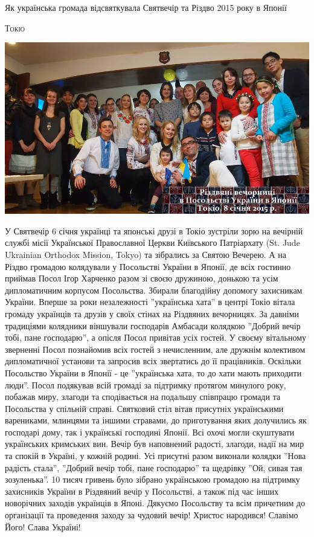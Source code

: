 \documentclass[10pt,a4paper]{article}
\newcommand{\NewsItem}[1]{%
		\usefont{T2A}{iwona}{m}{n} 
		\large #1 \vspace{4pt}
		\par \normalsize \normalfont}
\newcommand{\NewsAuthor}[1]{%
			\hfill \textsc{#1} \vspace{4pt}
			\par \normalfont}
\begin{document}
\newpage

\begin{multicols}{3}
\vspace{1cm}
\NewsItem{Як українська громада відсвяткувала Святвечір та Різдво 2015 року в Японії}
\NewsAuthor{Токіо}
		\begin{center}
			\includegraphics[width=0.8\linewidth]{images/rizdvo}
		\end{center}
У Святвечір 6 січня українці та японські друзі в Токіо зустріли зорю на вечірній службі місії Української Православної Церкви Київського Патріархату (St. Jude Ukrainian Orthodox Mission, Tokyo) та зібрались за Святою Вечерею.
А на Різдво громадою колядували у Посольствi України в Японії, де всіх гостинно приймав Посол Ігор Харченко разом зі своєю дружиною, донькою та усім дипломатичним корпусом Посольства. Збирали благодійну допомогу захисникам України.
Вперше за роки незалежності ''українська хата'' в центрі Токіо вітала громаду українців та друзів у своїх стінах на Різдвяних вечорницях. За давніми традиціями колядники віншували господарів Амбасади колядкою ''Добрий вечір тобі, пане господарю'', а опісля Посол привітав усіх гостей.
У своєму вітальному зверненні Посол познайомив всіх гостей з нечисленним, але дружнім колективом дипломатичної установи та запросив всіх звертатись до її працівників. Оскільки Посольство України в Японії - це ''українська хата, то до хати мають приходити люди''. Посол подякував всій громаді за підтримку протягом минулого року, побажав миру, злагоди та сподівається на подальшу співпрацю громади та Посольства у спільній справі.
Святковий стіл вітав присутніх українськими варениками, млинцями та іншими стравами, до приготування яких долучились як господарі дому, так і українські господині Японії. Всі охочі могли скуштувати українських кримських вин.
Вечір був наповнений радості, злагоди, надії на мир та спокій в Україні, у кожній родині. Усі присутні разом виконали колядки ''Нова радість стала'', ''Добрий вечір тобі, пане господарю'' та щедрівку ''Ой, сивая тая зозуленька''.
10 тисяч гривень було зібрано українською громадою на підтримку захисників України в Різдвяний вечір у Посольстві, а також під час інших новорічних заходів українців в Японі.
Дякуємо Посольству та всім причетним до організації та проведення заходу за чудовий вечір!
Христос народився! Славімо Його!
Слава Україні!


\end{multicols}
\end{document}
